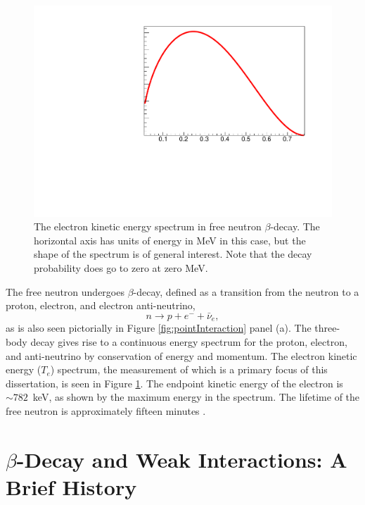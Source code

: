 \begin{figure}
  \centering
  \includegraphics[page=1,scale=0.4]{1-Introduction/betaSpectrum.pdf}
    \caption{The electron kinetic energy spectrum in free neutron $\beta$-decay. The horizontal
      axis has units of energy in MeV in this case, but the shape of the spectrum
      is of general interest. Note that the decay probability does go to zero at zero
      MeV.}
  \label{fig:betaSpectrum}
\end{figure}

The free neutron undergoes $\beta$-decay, defined as a transition from the neutron
to a proton, electron, and electron anti-neutrino,
\begin{equation*}
  n\rightarrow p + e^- + \bar{\nu}_{e},
\end{equation*}
\noindent as is also seen pictorially in Figure \ref{fig:pointInteraction} panel (a).
The three-body decay gives rise to a continuous energy spectrum
for the proton, electron, and anti-neutrino by conservation of energy and momentum.
The electron kinetic energy ($T_e$) spectrum, the measurement of which is a primary focus of this
dissertation, is seen in Figure \ref{fig:betaSpectrum}. The endpoint kinetic energy of the electron
is $\sim 782$~keV, as shown by the maximum energy in the spectrum. The lifetime of the free neutron is
approximately fifteen minutes \cite{pdg}.


\section{$\beta$-Decay and Weak Interactions: A Brief History}

